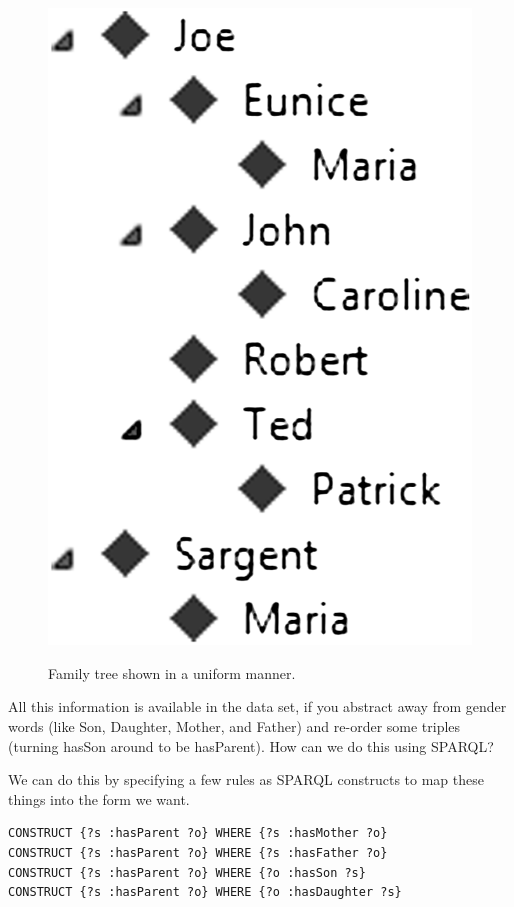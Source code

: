 \begin{challenge}
\begin{figure}
\centering
\includegraphics[width=5in]{media/ch6/f06-09.png}
\label{fig:ch6.9}
\caption{Family tree shown in a uniform manner.}
\end{figure}

All this information is available in the data set, if you abstract away
from gender words (like Son, Daughter, Mother, and Father) and re-order
some triples (turning hasSon around to be hasParent). How can we do this
using SPARQL?

We can do this by specifying a few rules as SPARQL constructs to map
these things into the form we want.

\begin{lstlisting}
CONSTRUCT {?s :hasParent ?o} WHERE {?s :hasMother ?o} 
CONSTRUCT {?s :hasParent ?o} WHERE {?s :hasFather ?o} 
CONSTRUCT {?s :hasParent ?o} WHERE {?o :hasSon ?s} 
CONSTRUCT {?s :hasParent ?o} WHERE {?o :hasDaughter ?s}
\end{lstlisting}


\end{challenge}
